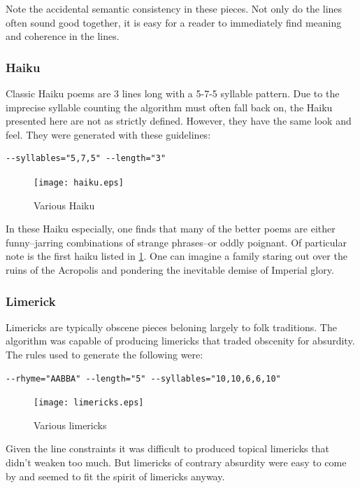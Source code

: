 \documentclass[10pt]{article}
\begin{document}
Note the accidental semantic consistency in these pieces. Not only do the lines
often sound good together, it is easy for a reader to immediately find meaning
and coherence in the lines.

\subsubsection{Haiku}
Classic Haiku poems are 3 lines long with a 5-7-5 syllable pattern. Due to the
imprecise syllable counting the algorithm must often fall back on, the Haiku
presented here are not as strictly defined. However, they have the same look
and feel. They were generated with these guidelines:
\begin{verbatim}
--syllables="5,7,5" --length="3" 
\end{verbatim}

\begin{figure}[here]
\begin{center}
    \texttt{[image: haiku.eps]}
\end{center}
\caption{Various Haiku}
\label{fig:haiku}
\end{figure}

In these Haiku especially, one finds that many of the better poems are either
funny--jarring combinations of strange phrases--or oddly poignant. Of
particular note is the first haiku listed in \ref{fig:haiku}. One can imagine
a family staring out over the ruins of the Acropolis and pondering the
inevitable demise of Imperial glory.

\subsubsection{Limerick}
Limericks are typically obscene pieces beloning largely to folk traditions. The
algorithm was capable of producing limericks that traded obscenity for
absurdity. The rules used to generate the following were:

\begin{verbatim}
--rhyme="AABBA" --length="5" --syllables="10,10,6,6,10"
\end{verbatim}

\begin{figure}[here]
\begin{center}
    \texttt{[image: limericks.eps]}
\end{center}
\caption{Various limericks}
\label{fig:limericks}
\end{figure}

Given the line constraints it was difficult to produced topical limericks that
didn't weaken too much. But limericks of contrary absurdity were easy to come
by and seemed to fit the spirit of limericks anyway.
\end{document}
